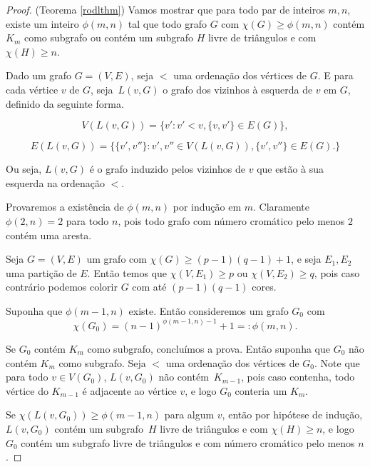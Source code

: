\documentclass{article}
\begin{document}
\begin{proof}{(Teorema \ref{rodlthm})}
Vamos mostrar que para todo par de inteiros $m,n$, existe um inteiro $\phi(m,n)$ tal que todo grafo $G$ com $\chi(G) \geq \phi(m,n)$ contém $K_m$ como subgrafo ou contém um subgrafo $H$ livre de triângulos e com $\chi(H) \geq n$.


Dado um grafo $G = (V,E)$, seja $<$ uma ordenação dos vértices de $G$. E para cada vértice $v$ de $G$, seja~$L(v,G)$ o grafo dos vizinhos à esquerda de $v$ em $G$, definido da seguinte forma.

\[V(L(v,G)) = \{v' : v' < v, \{v,v'\}\in E(G)\},\]

\[E(L(v,G)) = \{\{v',v''\}: v',v'' \in V(L(v,G)), \{v',v''\} \in E(G).\}\]

Ou seja, $L(v,G)$ é o grafo induzido pelos vizinhos de $v$ que estão à sua esquerda na ordenação $<$.

Provaremos a existência de $\phi(m,n)$ por indução em $m$. Claramente $\phi(2,n) = 2$ para todo $n$, pois todo grafo com número cromático pelo menos $2$ contém uma aresta.

Seja $G = (V,E)$ um grafo com $\chi(G) \geq (p-1)(q-1)+1$, e seja $E_1,E_2$ uma partição de $E$. Então temos que $\chi(V,E_1) \geq p$ ou $\chi(V,E_2) \geq q$, pois caso contrário podemos colorir $G$ com até $(p-1)(q-1)$ cores.

Suponha que $\phi(m-1,n)$ existe. Então consideremos um grafo $G_0$ com \[\chi(G_0) = (n-1)^{\phi(m-1,n)-1}+1 =: \phi(m,n).\]

Se $G_0$ contém $K_m$ como subgrafo, concluímos a prova. Então suponha que $G_0$ não contém $K_m$ como subgrafo. Seja $<$ uma ordenação dos vértices de $G_0$. Note que para todo $v \in V(G_0)$, $L(v,G_0)$ não contém~$K_{m-1}$, pois caso contenha, todo vértice do $K_{m-1}$ é adjacente ao vértice $v$, e logo $G_0$ conteria um $K_m$.

Se $\chi(L(v,G_0)) \geq \phi(m-1,n)$ para algum $v$, então por hipótese de indução, $L(v,G_0)$ contém um subgrafo~$H$ livre de triângulos e com $\chi(H) \geq n$, e logo $G_0$ contém um subgrafo livre de triângulos e com número cromático pelo menos $n$.


\end{proof}
\end{document}
